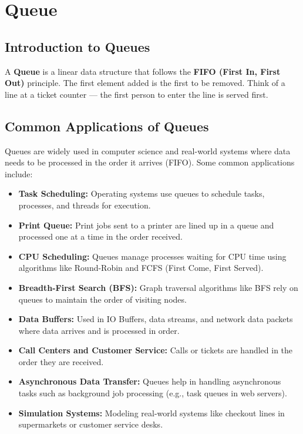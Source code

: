 
\section{Queue}

\subsection{Introduction to Queues}
A \textbf{Queue} is a linear data structure that follows the \textbf{FIFO (First In, First Out)} principle. The first element added is the first to be removed. Think of a line at a ticket counter — the first person to enter the line is served first.

\subsection{Common Applications of Queues}

Queues are widely used in computer science and real-world systems where data needs to be processed in the order it arrives (FIFO). Some common applications include:

\begin{itemize}
    \item \textbf{Task Scheduling:} Operating systems use queues to schedule tasks, processes, and threads for execution.
    
    \item \textbf{Print Queue:} Print jobs sent to a printer are lined up in a queue and processed one at a time in the order received.
    
    \item \textbf{CPU Scheduling:} Queues manage processes waiting for CPU time using algorithms like Round-Robin and FCFS (First Come, First Served).
    
    \item \textbf{Breadth-First Search (BFS):} Graph traversal algorithms like BFS rely on queues to maintain the order of visiting nodes.
    
    \item \textbf{Data Buffers:} Used in IO Buffers, data streams, and network data packets where data arrives and is processed in order.
    
    \item \textbf{Call Centers and Customer Service:} Calls or tickets are handled in the order they are received.
    
    \item \textbf{Asynchronous Data Transfer:} Queues help in handling asynchronous tasks such as background job processing (e.g., task queues in web servers).
    
    \item \textbf{Simulation Systems:} Modeling real-world systems like checkout lines in supermarkets or customer service desks.
\end{itemize}


